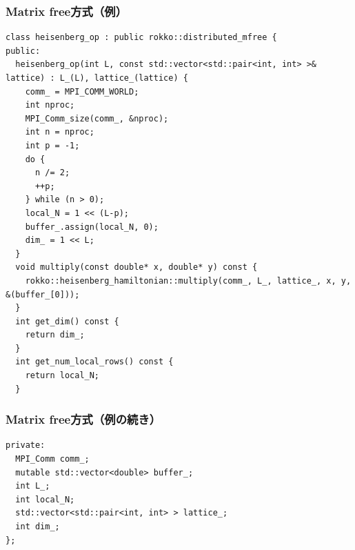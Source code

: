 \begin{frame}[c,fragile]
  \frametitle{Matrix free方式（例）}
\begin{lstlisting}
class heisenberg_op : public rokko::distributed_mfree {
public:
  heisenberg_op(int L, const std::vector<std::pair<int, int> >& lattice) : L_(L), lattice_(lattice) {
    comm_ = MPI_COMM_WORLD;
    int nproc;
    MPI_Comm_size(comm_, &nproc);
    int n = nproc;
    int p = -1;
    do {
      n /= 2;
      ++p;
    } while (n > 0);
    local_N = 1 << (L-p);
    buffer_.assign(local_N, 0);
    dim_ = 1 << L;
  }
  void multiply(const double* x, double* y) const {
    rokko::heisenberg_hamiltonian::multiply(comm_, L_, lattice_, x, y, &(buffer_[0]));
  }
  int get_dim() const {
    return dim_;
  }
  int get_num_local_rows() const {
    return local_N;
  }
\end{lstlisting}
\end{frame}

\begin{frame}[c,fragile]
  \frametitle{Matrix free方式（例の続き）}
\begin{lstlisting}
private:
  MPI_Comm comm_;
  mutable std::vector<double> buffer_;
  int L_;
  int local_N;
  std::vector<std::pair<int, int> > lattice_;
  int dim_;
};
\end{lstlisting}
\end{frame}


